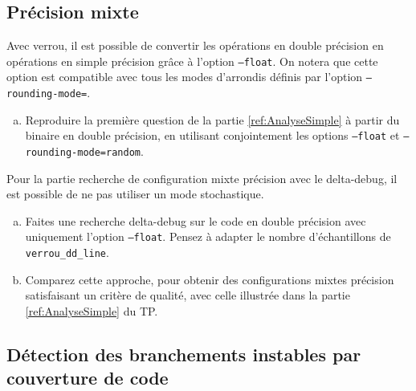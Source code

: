 \documentclass[a4paper]{article}
\newcounter{Question}
\newenvironment{question}[1][\unskip]{
  \bigskip
  \stepcounter{Question}
  \def\questionTitle{ #1}
  \begin{mdframed}[style=question]
  }{
  \end{mdframed}
}
\begin{document}
\subsection{Précision mixte}
Avec verrou, il est possible de convertir les opérations en double
précision en opérations en simple précision grâce à l'option
\texttt{--float}. On notera que cette option est compatible avec tous
les modes d'arrondis définis par l'option \texttt{--rounding-mode=}.

\begin{question}
\begin{enumerate}[(a)]
\item Reproduire la première question de la partie \ref{ref:AnalyseSimple} à partir du binaire en double précision, en utilisant conjointement
  les options \texttt{--float} et \texttt{--rounding-mode=random}.
\end{enumerate}
\end{question}

Pour la partie recherche de configuration mixte précision avec le delta-debug, il est possible de ne pas utiliser un mode stochastique.
\begin{question}
\begin{enumerate}[(a)]
\item Faites une recherche delta-debug sur le code en double précision
  avec uniquement l'option \texttt{--float}.
  Pensez à adapter le nombre d'échantillons de \texttt{verrou\_dd\_line}.
\item Comparez cette approche, pour obtenir des configurations mixtes
  précision satisfaisant un critère de qualité, avec celle illustrée
  dans la partie \ref{ref:AnalyseSimple} du TP.
\end{enumerate}
\end{question}






\subsection{Détection des branchements instables par couverture de code}
\label{cover}
\end{document}
